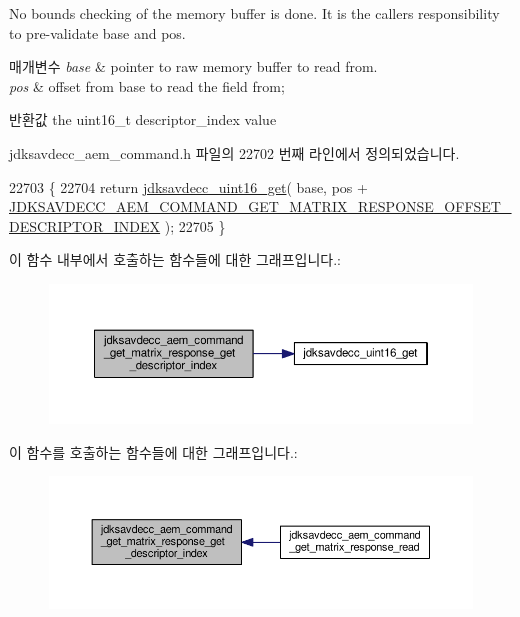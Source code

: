No bounds checking of the memory buffer is done. It is the caller\textquotesingle{}s responsibility to pre-\/validate base and pos.


\begin{DoxyParams}{매개변수}
{\em base} & pointer to raw memory buffer to read from. \\
\hline
{\em pos} & offset from base to read the field from; \\
\hline
\end{DoxyParams}
\begin{DoxyReturn}{반환값}
the uint16\+\_\+t descriptor\+\_\+index value 
\end{DoxyReturn}


jdksavdecc\+\_\+aem\+\_\+command.\+h 파일의 22702 번째 라인에서 정의되었습니다.


\begin{DoxyCode}
22703 \{
22704     \textcolor{keywordflow}{return} \hyperlink{group__endian_ga3fbbbc20be954aa61e039872965b0dc9}{jdksavdecc\_uint16\_get}( base, pos + 
      \hyperlink{group__command__get__matrix__response_gaa34f4ff1cf9d8b2cbf6feff537d94927}{JDKSAVDECC\_AEM\_COMMAND\_GET\_MATRIX\_RESPONSE\_OFFSET\_DESCRIPTOR\_INDEX}
       );
22705 \}
\end{DoxyCode}


이 함수 내부에서 호출하는 함수들에 대한 그래프입니다.\+:
\nopagebreak
\begin{figure}[H]
\begin{center}
\leavevmode
\includegraphics[width=350pt]{group__command__get__matrix__response_gaa0ada59a8293e8676299e3f5a74556cf_cgraph}
\end{center}
\end{figure}




이 함수를 호출하는 함수들에 대한 그래프입니다.\+:
\nopagebreak
\begin{figure}[H]
\begin{center}
\leavevmode
\includegraphics[width=350pt]{group__command__get__matrix__response_gaa0ada59a8293e8676299e3f5a74556cf_icgraph}
\end{center}
\end{figure}


